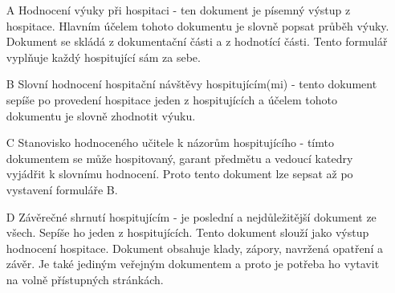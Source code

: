 \label{sec:formulare}
\begin{itemize}
\item[A] Hodnocení výuky při hospitaci - ten dokument  je písemný výstup z hospitace. Hlavním účelem tohoto dokumentu je slovně popsat průběh výuky. Dokument se skládá z dokumentační části a z hodnotící části. Tento formulář vyplňuje každý hospitující sám za sebe.
\item[B] Slovní hodnocení hospitační návštěvy hospitujícím(mi) - tento dokument sepíše po provedení hospitace jeden z hospitujících a účelem tohoto dokumentu je slovně zhodnotit výuku. 
\item[C] Stanovisko hodnoceného učitele k názorům hospitujícího - tímto dokumentem se může hospitovaný, garant předmětu a vedoucí katedry vyjádřit k slovnímu hodnocení. Proto tento dokument lze sepsat až po vystavení formuláře B.
\item[D] Závěrečné shrnutí hospitujícím - je poslední a nejdůležitější dokument ze všech. Sepíše ho jeden z hospitujících. Tento dokument slouží jako výstup hodnocení hospitace. Dokument obsahuje klady, zápory, navržená opatření a závěr. Je také jediným veřejným dokumentem a proto je potřeba ho vytavit na volně přístupných stránkách.
\end{itemize}